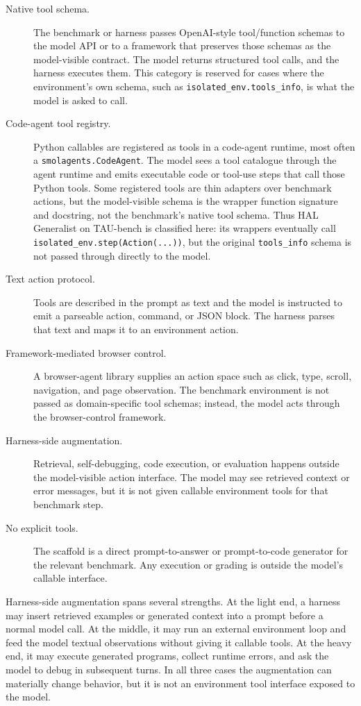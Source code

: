 \begin{description}
\item[Native tool schema.] The benchmark or harness passes OpenAI-style
tool/function schemas to the model API or to a framework that preserves those
schemas as the model-visible contract. The model returns structured tool calls,
and the harness executes them. This category is reserved for cases where the
environment's own schema, such as \texttt{isolated\_env.tools\_info}, is what
the model is asked to call.
\item[Code-agent tool registry.] Python callables are registered as tools in a
code-agent runtime, most often a \texttt{smolagents.CodeAgent}. The model sees a
tool catalogue through the agent runtime and emits executable code or tool-use
steps that call those Python tools. Some registered tools are thin adapters over
benchmark actions, but the model-visible schema is the wrapper function
signature and docstring, not the benchmark's native tool schema. Thus HAL
Generalist on TAU-bench is classified here: its wrappers eventually call
\texttt{isolated\_env.step(Action(...))}, but the original
\texttt{tools\_info} schema is not passed through directly to the model.
\item[Text action protocol.] Tools are described in the prompt as text and the
model is instructed to emit a parseable action, command, or JSON block. The
harness parses that text and maps it to an environment action.
\item[Framework-mediated browser control.] A browser-agent library supplies an
action space such as click, type, scroll, navigation, and page observation. The
benchmark environment is not passed as domain-specific tool schemas; instead,
the model acts through the browser-control framework.
\item[Harness-side augmentation.] Retrieval, self-debugging, code execution, or
evaluation happens outside the model-visible action interface. The model may see
retrieved context or error messages, but it is not given callable environment
tools for that benchmark step.
\item[No explicit tools.] The scaffold is a direct prompt-to-answer or
prompt-to-code generator for the relevant benchmark. Any execution or grading is
outside the model's callable interface.
\end{description}

Harness-side augmentation spans several strengths. At the light end, a harness
may insert retrieved examples or generated context into a prompt before a normal
model call. At the middle, it may run an external environment loop and feed the
model textual observations without giving it callable tools. At the heavy end,
it may execute generated programs, collect runtime errors, and ask the model to
debug in subsequent turns. In all three cases the augmentation can materially
change behavior, but it is not an environment tool interface exposed to the
model.

